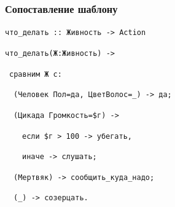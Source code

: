 \documentclass{beamer}
\begin{document}
\begin{frame}
  \frametitle{Сопоставление шаблону}
  \pause
  \begin{block}{}
    \texttt{{\color{red}что\_делать} :: {\color{blue}Живность} -> {\color{blue}Action}}
    \pause

    \texttt{{\color{red}что\_делать}(Ж:{\color{blue}Живность}) ->}

    \mbox{ }\texttt{{\color{magenta}сравним} Ж {\color{magenta}с}:}
    \pause

    \mbox{ }\mbox{ }\texttt{({\color{blue}Человек} Пол={\color{red}да}, ЦветВолос=\_) -> {\color{red}да};}
    \pause

    \mbox{ }\mbox{ }\texttt{({\color{blue}Цикада} Громкость=\$г) ->}

    \mbox{ }\mbox{ }\mbox{ }\mbox{ }\texttt{{\color{magenta}если} \$г > 100 -> {\color{red}убегать},}

    \mbox{ }\mbox{ }\mbox{ }\mbox{ }\texttt{{\color{magenta}иначе} -> {\color{red}слушать};}
    \pause

    \mbox{ }\mbox{ }\texttt{({\color{blue}Мертвяк}) -> {\color{red}сообщить\_куда\_надо};}
    \pause

    \mbox{ }\mbox{ }\texttt{(\_) -> {\color{red}созерцать}.}
  \end{block}
\end{frame}
\end{document}
